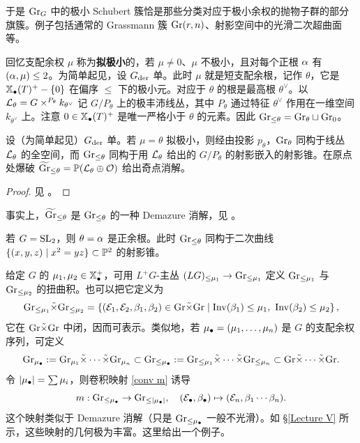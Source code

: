 于是 ${\operatorname{Gr}}_G$ 中的极小 Schubert 簇恰是那些分类对应于极小余权的抛物子群的部分旗簇。例子包括通常的 Grassmann 簇 ${\operatorname{Gr}}(r,n)$、射影空间中的光滑二次超曲面等。

回忆支配余权 $\mu$ 称为\textbf{拟极小}的，若 $\mu\neq 0$、$\mu$ 不极小，且对每个正根 ${\alpha}$ 有 $({\alpha},\mu)\leq 2$。为简单起见，设 $G_{\operatorname{der}}$ 单。此时 $\mu$ 就是短支配余根，记作 $\theta$，它是 $\mathbb{X}_\bullet(T)^+-\{0\}$ 在偏序 $\leq$ 下的极小元。对应于 $\theta$ 的根是最高根 $\theta^\vee$。以 ${\mathcal L}_\theta=G\times^{P_\theta} k_{\theta^\vee}$ 记 $G/P_\theta$ 上的极丰沛线丛，其中 $P_\theta$ 通过特征 $\theta^\vee$ 作用在一维空间 $k_{\theta^\vee}$ 上。注意 $0\in\mathbb{X}_\bullet(T)^+$ 是唯一严格小于 $\theta$ 的元素。因此 ${\operatorname{Gr}}_{\leq \theta}={\operatorname{Gr}}_\theta\sqcup {\operatorname{Gr}}_0$。

\begin{lem}\label{quasiminusch}
设（为简单起见）$G_{\operatorname{der}}$ 单。若 $\mu=\theta$ 拟极小，则经由投影 $p_\theta$，${\operatorname{Gr}}_\theta$ 同构于线丛 ${\mathcal L}_\theta$ 的全空间，而 ${\operatorname{Gr}}_{\leq \theta}$ 同构于用 ${\mathcal L}_\theta$ 给出的 $G/P_\theta$ 的射影嵌入的射影锥。在原点处爆破 $\widetilde{{\operatorname{Gr}}}_{\leq \theta}= {\mathbb P}({\mathcal L}_{\theta}\oplus {\mathcal O})$ 给出奇点消解。
\end{lem}

\begin{proof}见 \cite[\S\ 7]{NP}。
\end{proof}

\begin{rmk}
事实上，$\widetilde{{\operatorname{Gr}}}_{\leq \theta}$ 是 ${\operatorname{Gr}}_{\leq \theta}$ 的一种 Demazure 消解，见 \cite[Lemma 2.12]{Z14}。
\end{rmk}

\begin{ex}
若 $G={\operatorname{SL}}_2$，则 $\theta={\alpha}$ 是正余根。此时 ${\operatorname{Gr}}_{\leq \theta}$ 同构于二次曲线 $\{(x,y,z)\mid x^2=yz\}\subset {\mathbb P}^2$ 的射影锥。
\end{ex}

给定 $G$ 的 $\mu_1,\mu_2\in \mathbb{X}_\bullet^+$，可用 $L^+G$-主丛 $(LG)_{\leq \mu_1}\to {\operatorname{Gr}}_{\leq \mu_1}$ 定义 ${\operatorname{Gr}}_{\leq \mu_1}$ 与 ${\operatorname{Gr}}_{\leq \mu_2}$ 的扭曲积。也可以把它定义为
\[{\operatorname{Gr}}_{\leq \mu_1}\tilde{\times}{\operatorname{Gr}}_{\leq \mu_2}=\left\{({\mathcal E}_1,{\mathcal E}_2,\beta_1,\beta_2)\in{\operatorname{Gr}}\tilde\times{\operatorname{Gr}}\mid {\operatorname{Inv}}(\beta_1)\leq \mu_1,\ {\operatorname{Inv}}(\beta_2)\leq \mu_2\right\},\]
它在 ${\operatorname{Gr}}\tilde\times{\operatorname{Gr}}$ 中闭，因而可表示。类似地，若 $\mu_\bullet=(\mu_1,\ldots,\mu_n)$ 是 $G$ 的支配余权序列，可定义
\[{\operatorname{Gr}}_{\mu_\bullet}:={\operatorname{Gr}}_{\mu_1}\tilde\times\cdots\tilde\times{\operatorname{Gr}}_{\mu_n}\subset {\operatorname{Gr}}_{\leq\mu_\bullet}:={\operatorname{Gr}}_{\leq \mu_1}\tilde\times\cdots\tilde\times{\operatorname{Gr}}_{\leq \mu_n}\subset{\operatorname{Gr}}\tilde\times\cdots\tilde\times{\operatorname{Gr}}.\]
令 $|\mu_\bullet|=\sum \mu_i$，则卷积映射 \eqref{conv m} 诱导
\begin{equation}\label{conv m2}
m: {\operatorname{Gr}}_{\leq \mu_\bullet}\to {\operatorname{Gr}}_{\leq |\mu_\bullet|}, \quad ({\mathcal E}_\bullet,\beta_\bullet)\mapsto ({\mathcal E}_n,\beta_1\cdots\beta_n).
\end{equation}
这个映射类似于 Demazure 消解（只是 ${\operatorname{Gr}}_{\leq \mu_\bullet}$ 一般不光滑）。如 \S\ref{Lecture V} 所示，这些映射的几何极为丰富。这里给出一个例子。


